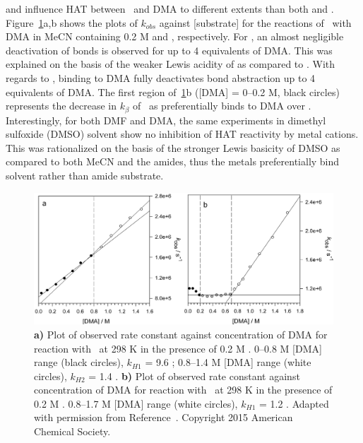 and  influence HAT between \cumo\ and DMA to different extents than both  and . Figure~\ref{fig:k-metals-naca}a,b shows the plots of $k_{obs}$ against [substrate] for the reactions of \cumo\ with DMA in MeCN containing 0.2 M  and , respectively. For , an almost negligible deactivation of  bonds is observed for up to 4 equivalents of DMA. This was explained on the basis of the weaker Lewis acidity of  as compared to . With regards to , binding to DMA fully deactivates  bond abstraction up to 4 equivalents of DMA. The first region of~\ref{fig:k-metals-naca}b ([DMA] = 0--0.2 M, black circles) represents the decrease in $k_\beta$ of \cumo\ as  preferentially binds to DMA over \cumo. Interestingly, for both DMF and DMA, the same experiments in dimethyl sulfoxide (DMSO) solvent show no inhibition of HAT reactivity by metal cations. This was rationalized on the basis of the stronger Lewis basicity of DMSO as compared to both MeCN and the amides, thus the metals preferentially bind solvent rather than amide substrate.

\begin{figure}[!htbp]
  \includegraphics[width=\textwidth]{figures/exptdma-na-ca.png}
  \caption[Plot of observed rate constant against concentration of DMA for reaction with \cumo\ at 298 K in the presence of 0.2 M  and .]
  {\textbf{a)} Plot of observed rate constant against concentration of DMA for reaction with \cumo\ at 298 K in the presence of 0.2 M . 0--0.8 M [DMA] range (black circles), $k_{H1}$ = 9.6 \Ms; 0.8--1.4 M [DMA] range (white circles), $k_{H2}$ = 1.4 \Ms.
  \textbf{b)} Plot of observed rate constant against concentration of DMA for reaction with \cumo\ at 298 K in the presence of 0.2 M . 0.8--1.7 M [DMA] range (white circles), $k_{H1}$ = 1.2 \Ms. Adapted with permission from Reference~\protect{}. Copyright 2015 American Chemical Society.}
  \label{fig:k-metals-naca}
\end{figure}

